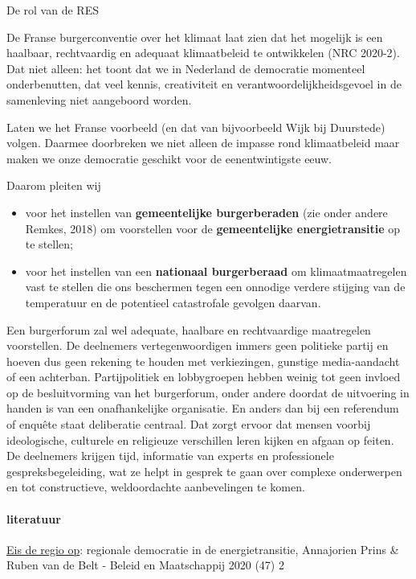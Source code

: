\begin{voorstel}{De rol van de RES}
\begin{overwegingen}
De Franse burgerconventie over het klimaat laat zien dat het mogelijk is een haalbaar, rechtvaardig en adequaat klimaatbeleid te ontwikkelen (NRC 2020-2). Dat niet alleen: het toont dat we in Nederland de democratie momenteel onderbenutten, dat veel kennis, creativiteit en verantwoordelijkheidsgevoel in de samenleving niet aangeboord worden.

Laten we het Franse voorbeeld (en dat van bijvoorbeeld Wijk bij Duurstede) volgen. Daarmee doorbreken we niet alleen de impasse rond klimaatbeleid maar maken we onze democratie geschikt voor de eenentwintigste eeuw.
\end{overwegingen}

\begin{aanbevelingen}
Daarom pleiten wij 
\begin{itemize}
	\item voor het instellen van \textbf{gemeentelijke burgerberaden} (zie onder andere Remkes, 2018) om voorstellen voor de \textbf{gemeentelijke energietransitie} op te stellen;
	\item voor het instellen van een \textbf{nationaal burgerberaad} om klimaatmaatregelen vast te stellen die ons beschermen tegen een onnodige verdere stijging van de temperatuur en de potentieel catastrofale gevolgen daarvan.
\end{itemize}
Een burgerforum zal wel adequate, haalbare en rechtvaardige maatregelen voorstellen. De deelnemers vertegenwoordigen immers geen politieke partij en hoeven dus geen rekening te houden met verkiezingen, gunstige media-aandacht of een achterban. Partijpolitiek en lobbygroepen hebben weinig tot geen invloed op de besluitvorming van het burgerforum, onder andere doordat de uitvoering in handen is van een onafhankelijke organisatie. En anders dan bij een referendum of enquête staat deliberatie centraal. Dat zorgt ervoor dat mensen voorbij ideologische, culturele en religieuze verschillen leren kijken en afgaan op feiten. De deelnemers krijgen tijd, informatie van experts en professionele gespreksbegeleiding, wat ze helpt in gesprek te gaan over complexe onderwerpen en tot constructieve, weldoordachte aanbevelingen te komen.
\end{aanbevelingen}

\paragraph{literatuur}

\href{https://energievoordrenthe.nl/toolkit/volksvertegenwoordigers/HandlerDownloadFiles.ashx?idnv=1688984}{Eis de regio op}: regionale democratie in de energietransitie, Annajorien Prins \& Ruben van de Belt - Beleid en Maatschappij 2020 (47) 2


\end{voorstel}
